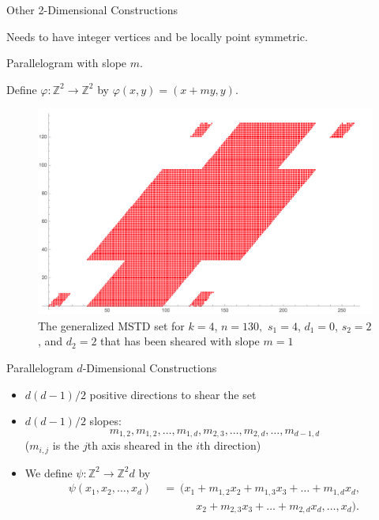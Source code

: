 \documentclass[11pt]{beamer}
\newcommand{\Z}{\mathbb{Z}}
\begin{document}
\begin{frame}{Other 2-Dimensional Constructions}

Needs to  have integer vertices and be locally point symmetric.

\pause
\bigskip

Parallelogram with slope $m$.

\pause 
\bigskip

Define $\varphi: \Z^2 \to \Z^2$ by $\varphi(x,y)= (x+my, y).$ 

\pause

\begin{figure}
    \centering
    \includegraphics[scale=.2]{parallelogram.png}
    \caption{The generalized MSTD set for $k=4$, $n=130,$ $s_1=4$, $d_1=0$, $s_2=2$, and $d_2=2$ that has been sheared with slope $m=1$}
    \label{fig:my_label}
\end{figure}

\end{frame}


\begin{frame}{Parallelogram $d$-Dimensional Constructions}
\begin{itemize}
    \item $d(d-1)/2$ positive directions to shear the set 
    
    \pause
    \bigskip
    
    \item  $d(d-1)/2$ slopes:
        $$m_{1,2}, m_{1,2}, \ldots, m_{1,d}, m_{2,3}, \ldots, m_{2,d}, \ldots, m_{d-1,d}$$
        \pause
        ($m_{i,j}$ is the $j$th axis sheared in the $i$th direction)
    
    \pause
    \bigskip
    
    \item We define $\psi: \Z^2 \to \Z^2d$ by 
        \begin{align*}
            \psi(x_1, x_2, \ldots, x_d) \ &= \ (x_1 +m_{1,2}x_2 + m_{1,3}x_3 + \ldots + m_{1,d}x_d,\\
            &\qquad\quad x_2 +m_{2,3}x_3  + \ldots + m_{2,d}x_d, \ldots, x_d).
        \end{align*}
\end{itemize}

\end{frame}
\end{document}
